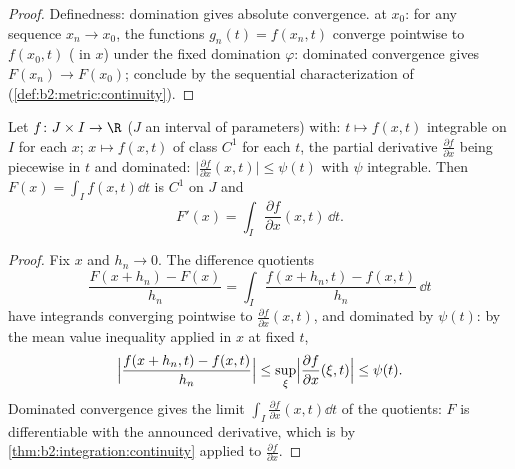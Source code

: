 \begin{proof}
Definedness: domination gives absolute convergence.  at
$x_0$: for any sequence $x_n \to x_0$, the functions $g_n(t) =
f(x_n, t)$ converge pointwise to $f(x_0, t)$ ( in $x$)
under the fixed domination $\varphi$: dominated convergence gives
$F(x_n) \to F(x_0)$; conclude by the sequential characterization of
 (\cref{def:b2:metric:continuity}).
\end{proof}

\begin{theorem}\label{thm:b2:integration:leibnizrule}
Let $f \colon J \times I \to \R$ ($J$ an interval of parameters)
with: $t \mapsto f(x,t)$ integrable on $I$ for each $x$; $x \mapsto
f(x,t)$ of class $C^1$ for each $t$, the partial derivative
$\frac{\partial f}{\partial x}$ being piecewise  in $t$
and dominated: $\bigl|\frac{\partial f}{\partial x}(x,t)\bigr| \leq
\psi(t)$ with $\psi$ integrable. Then $F(x) = \int_I f(x,t)\dd t$
is $C^1$ on $J$ and
\[
F'(x) = \int_I \frac{\partial f}{\partial x}(x, t)\,\dd t .
\]
\end{theorem}

\begin{proof}
Fix $x$ and $h_n \to 0$. The difference quotients
\[
\frac{F(x + h_n) - F(x)}{h_n}
= \int_I \frac{f(x + h_n, t) - f(x, t)}{h_n}\,\dd t
\]
have integrands converging pointwise to $\frac{\partial f}{\partial
x}(x, t)$, and dominated by $\psi(t)$: by the mean value
inequality applied in $x$ at fixed $t$,
\[
\Bigl|\frac{f(x + h_n, t) - f(x,t)}{h_n}\Bigr|
\leq \sup_{\xi} \Bigl|\frac{\partial f}{\partial x}(\xi, t)\Bigr|
\leq \psi(t) .
\]
Dominated convergence gives the limit $\int_I \frac{\partial
f}{\partial x}(x,t)\dd t$ of the quotients: $F$ is differentiable
with the announced derivative, which is  by
\cref{thm:b2:integration:continuity} applied to $\frac{\partial
f}{\partial x}$.
\end{proof}

